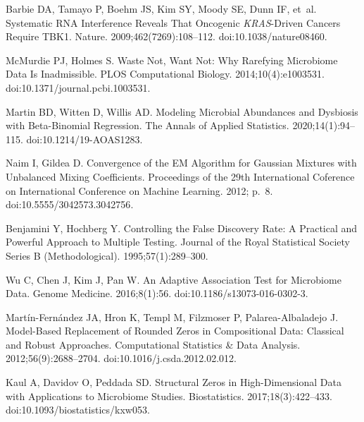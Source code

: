 \documentclass[10pt,letterpaper]{article}
\begin{document}
\begin{thebibliography}{10}
Barbie DA, Tamayo P, Boehm JS, Kim SY, Moody SE, Dunn IF, et~al.
\newblock Systematic {{RNA}} Interference Reveals That Oncogenic
  {{{\emph{KRAS}}}}-Driven Cancers Require {{TBK1}}.
\newblock Nature. 2009;462(7269):108--112.
\newblock doi:{10.1038/nature08460}.

McMurdie PJ, Holmes S.
\newblock Waste {{Not}}, {{Want Not}}: Why {{Rarefying Microbiome Data Is
  Inadmissible}}.
\newblock PLOS Computational Biology. 2014;10(4):e1003531.
\newblock doi:{10.1371/journal.pcbi.1003531}.

Martin BD, Witten D, Willis AD.
\newblock Modeling Microbial Abundances and Dysbiosis with Beta-Binomial
  Regression.
\newblock The Annals of Applied Statistics. 2020;14(1):94--115.
\newblock doi:{10.1214/19-AOAS1283}.

Naim I, Gildea D.
\newblock Convergence of the {{EM Algorithm}} for {{Gaussian Mixtures}} with
  {{Unbalanced Mixing Coefficients}}.
\newblock Proceedings of the 29th International Coference on International
  Conference on Machine Learning. 2012; p.~8.
\newblock doi:{10.5555/3042573.3042756}.

Benjamini Y, Hochberg Y.
\newblock Controlling the {{False Discovery Rate}}: A {{Practical}} and
  {{Powerful Approach}} to {{Multiple Testing}}.
\newblock Journal of the Royal Statistical Society Series B (Methodological).
  1995;57(1):289--300.

Wu C, Chen J, Kim J, Pan W.
\newblock An Adaptive Association Test for Microbiome Data.
\newblock Genome Medicine. 2016;8(1):56.
\newblock doi:{10.1186/s13073-016-0302-3}.

{Mart{\'i}n-Fern{\'a}ndez} JA, Hron K, Templ M, Filzmoser P,
  {Palarea-Albaladejo} J.
\newblock Model-Based Replacement of Rounded Zeros in Compositional Data:
  Classical and Robust Approaches.
\newblock Computational Statistics \& Data Analysis. 2012;56(9):2688--2704.
\newblock doi:{10.1016/j.csda.2012.02.012}.

Kaul A, Davidov O, Peddada SD.
\newblock Structural Zeros in High-Dimensional Data with Applications to
  Microbiome Studies.
\newblock Biostatistics. 2017;18(3):422--433.
\newblock doi:{10.1093/biostatistics/kxw053}.

\end{thebibliography}
\end{document}
